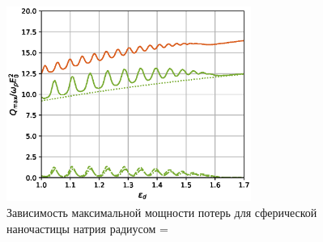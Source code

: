 \documentclass[12pt, a4paper]{article}
\begin{document}
\begin{figure}[h]
	\centering
	\includegraphics[width=80mm]{./image/natr.eps}
	\caption{Зависимость максимальной мощности потерь для сферической наночастицы натрия радиусом =}
	\label{natr}
\end{figure} 
\end{document}
